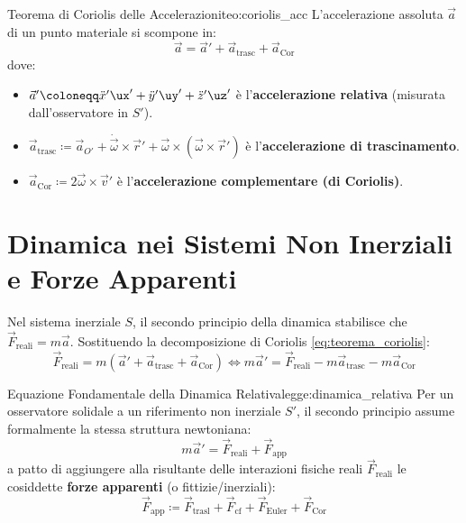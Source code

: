 \begin{teorema}{Teorema di Coriolis delle Accelerazioni}{teo:coriolis_acc}
L'accelerazione assoluta $\vec{a}$ di un punto materiale si scompone in:
\begin{equation}
    \vec{a} = \vec{a}' + \vec{a}_{\text{trasc}} + \vec{a}_{\text{Cor}}
    \label{eq:teorema_coriolis}
\end{equation}
dove:
\begin{itemize}
    \item $\vec{a}' \coloneqq \ddot{x}'\ux' + \ddot{y}'\uy' + \ddot{z}'\uz'$ è l'\textbf{accelerazione relativa} (misurata dall'osservatore in $S'$).
    \item $\vec{a}_{\text{trasc}} \coloneqq \vec{a}_{O'} + \dot{\vec{\omega}}\times\vec{r}' + \vec{\omega}\times(\vec{\omega}\times\vec{r}')$ è l'\textbf{accelerazione di trascinamento}.
    \item $\vec{a}_{\text{Cor}} \coloneqq 2\vec{\omega}\times\vec{v}'$ è l'\textbf{accelerazione complementare (di Coriolis)}.
\end{itemize}
\end{teorema}

\section{Dinamica nei Sistemi Non Inerziali e Forze Apparenti}
\label{sec:forze_apparenti}

Nel sistema inerziale $S$, il secondo principio della dinamica stabilisce che $\vec{F}_{\text{reali}} = m\vec{a}$. Sostituendo la decomposizione di Coriolis \eqref{eq:teorema_coriolis}:
\begin{equation}
    \vec{F}_{\text{reali}} = m(\vec{a}' + \vec{a}_{\text{trasc}} + \vec{a}_{\text{Cor}}) \iff m\vec{a}' = \vec{F}_{\text{reali}} - m\vec{a}_{\text{trasc}} - m\vec{a}_{\text{Cor}}
\end{equation}

\begin{legge}{Equazione Fondamentale della Dinamica Relativa}{legge:dinamica_relativa}
Per un osservatore solidale a un riferimento non inerziale $S'$, il secondo principio assume formalmente la stessa struttura newtoniana:
\begin{equation}
    m\vec{a}' = \vec{F}_{\text{reali}} + \vec{F}_{\text{app}}
    \label{eq:dinamica_non_inerziale}
\end{equation}
a patto di aggiungere alla risultante delle interazioni fisiche reali $\vec{F}_{\text{reali}}$ le cosiddette \textbf{forze apparenti} (o fittizie/inerziali):
\begin{equation}
    \vec{F}_{\text{app}} \coloneqq \vec{F}_{\text{trasl}} + \vec{F}_{\text{cf}} + \vec{F}_{\text{Euler}} + \vec{F}_{\text{Cor}}
\end{equation}
\end{legge}

